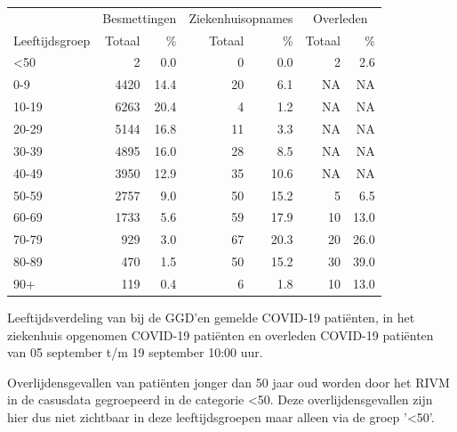 \documentclass[
  english,
  man,floatsintext]{apa6}
\begin{document}
\begin{table}
\centering\begingroup\fontsize{11}{13}\selectfont

\begin{threeparttable}
\begin{tabular}{lrrrrrr}
\toprule
\multicolumn{1}{c}{ } & \multicolumn{2}{c}{Besmettingen} & \multicolumn{2}{c}{Ziekenhuisopnames} & \multicolumn{2}{c}{Overleden} \\
\cmidrule(l{3pt}r{3pt}){2-3} \cmidrule(l{3pt}r{3pt}){4-5} \cmidrule(l{3pt}r{3pt}){6-7}
Leeftijdsgroep & Totaal & \% & Totaal & \% & Totaal & \%\\
\midrule
<50 & 2 & 0.0 & 0 & 0.0 & 2 & 2.6\\
0-9 & 4420 & 14.4 & 20 & 6.1 & NA & NA\\
10-19 & 6263 & 20.4 & 4 & 1.2 & NA & NA\\
20-29 & 5144 & 16.8 & 11 & 3.3 & NA & NA\\
30-39 & 4895 & 16.0 & 28 & 8.5 & NA & NA\\
40-49 & 3950 & 12.9 & 35 & 10.6 & NA & NA\\
50-59 & 2757 & 9.0 & 50 & 15.2 & 5 & 6.5\\
60-69 & 1733 & 5.6 & 59 & 17.9 & 10 & 13.0\\
70-79 & 929 & 3.0 & 67 & 20.3 & 20 & 26.0\\
80-89 & 470 & 1.5 & 50 & 15.2 & 30 & 39.0\\
90+ & 119 & 0.4 & 6 & 1.8 & 10 & 13.0\\
\bottomrule
\end{tabular}
\begin{tablenotes}
\item[1] Leeftijdsverdeling van bij de GGD’en gemelde COVID-19 patiënten, in het ziekenhuis opgenomen COVID-19 patiënten en overleden COVID-19 patiënten van 05 september t/m 19 september 10:00 uur.
\item[2] Overlijdensgevallen van patiënten jonger dan 50 jaar oud worden door het RIVM in de casusdata gegroepeerd in de categorie <50. Deze overlijdensgevallen zijn hier dus niet zichtbaar in deze leeftijdsgroepen maar alleen via de groep '<50'.
\end{tablenotes}
\end{threeparttable}
\endgroup{}
\end{table}

\newpage
\end{document}
